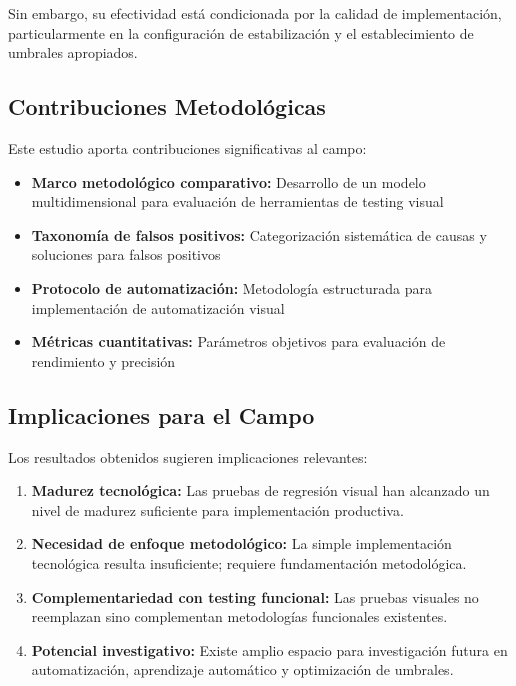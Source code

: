 \documentclass{article}
\begin{document}
Sin embargo, su efectividad está condicionada por la calidad de implementación, particularmente en la configuración de estabilización y el establecimiento de umbrales apropiados.

\subsection{Contribuciones Metodológicas}

Este estudio aporta contribuciones significativas al campo:

\begin{itemize}[nosep]
\item \textbf{Marco metodológico comparativo:} Desarrollo de un modelo multidimensional para evaluación de herramientas de testing visual
\item \textbf{Taxonomía de falsos positivos:} Categorización sistemática de causas y soluciones para falsos positivos
\item \textbf{Protocolo de automatización:} Metodología estructurada para implementación de automatización visual
\item \textbf{Métricas cuantitativas:} Parámetros objetivos para evaluación de rendimiento y precisión
\end{itemize}

\subsection{Implicaciones para el Campo}

Los resultados obtenidos sugieren implicaciones relevantes:

\begin{enumerate}[nosep]
\item \textbf{Madurez tecnológica:} Las pruebas de regresión visual han alcanzado un nivel de madurez suficiente para implementación productiva.

\item \textbf{Necesidad de enfoque metodológico:} La simple implementación tecnológica resulta insuficiente; requiere fundamentación metodológica.

\item \textbf{Complementariedad con testing funcional:} Las pruebas visuales no reemplazan sino complementan metodologías funcionales existentes.

\item \textbf{Potencial investigativo:} Existe amplio espacio para investigación futura en automatización, aprendizaje automático y optimización de umbrales.
\end{enumerate}
\end{document}
